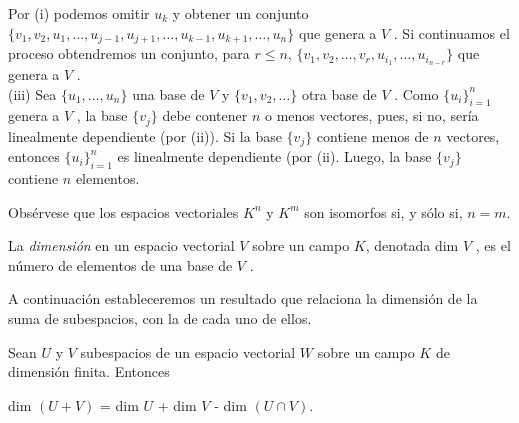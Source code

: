    Por (i) podemos omitir $ u_{k} $ y obtener un conjunto $ \{v_{1} , v_{2}, u_{1} , \ldots , u_{j-1} , u_{j+1} , \ldots , u_{k-1}, u_{k+1} , \ldots, u_{n} \} $ que genera a $ V $ . Si continuamos el proceso obtendremos un conjunto, para $ r \leq n $, $ \{v_{1} , v_{2}, \ldots , v_{r} , u_{i_{1}} , \ldots , u_{i_{n-r}} \} $ que genera a $ V $ .\\
   (iii) Sea $ \{u_{1} , \ldots , u_{n} \} $ una base de $  V $ y $ \{v_{1} , v_{2} ,\ldots\} $ otra base de $ V $ . Como $ \{u_{i}\}^{n}_{i=1} $ genera a $ V $ , la base $ \{v_{j}\} $ debe contener $ n $ o menos vectores, pues, si no, sería linealmente dependiente (por (ii)). Si la base $ \{v_{j}\}$ contiene menos de $ n $ vectores, entonces $ \{u_{i}\}^{n}_{i=1} $ es linealmente dependiente (por (ii). Luego, la base $ \{v_{j}\}$ contiene $ n $ elementos.
 
   Obsérvese que los espacios vectoriales $ K^{n} $ y $ K^{m} $ son isomorfos si, y sólo si, $ n = m $.
   \begin{defi}
   	 \normalfont 
   	 La \textit{dimensión} en un espacio vectorial $ V $ sobre un campo
   	$ K $, denotada dim $ V $ , es el número de elementos de una base de $ V $ .
   	
   	A continuación estableceremos un resultado que relaciona la dimensión de la suma de subespacios, con la de cada uno de ellos.
   \end{defi}
	\begin{teo}
		Sean  $ U $ y $ V $ subespacios de un espacio vectorial $ W $ sobre un campo $ K $ de dimensión finita. Entonces
		\begin{center}
			\normalfont dim $ (U+V) $ = dim $ U $ + dim $ V $ - dim $ (U \cap V) $.
		\end{center}
	\end{teo}
		 
